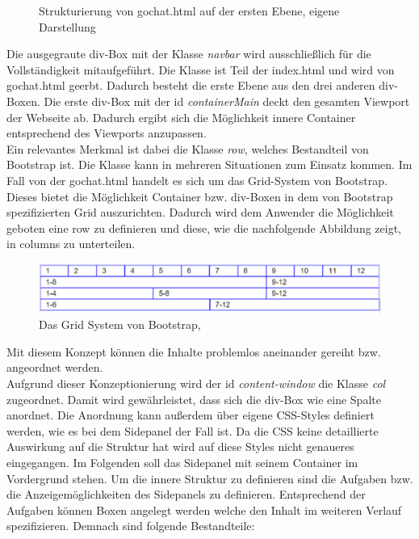 \documentclass[a4paper,titlepage,halfparskip,12pt]{scrreprt}
\begin{document}
\begin{onehalfspacing}
\begin{figure}[h]
	\caption{Strukturierung von gochat.html auf der ersten Ebene, eigene Darstellung}
	\label{img:BasisStruktur1Gochat}
\end{figure}
Die ausgegraute div-Box mit der Klasse \textit{navbar} wird ausschließlich für die Vollständigkeit mitaufgeführt. Die Klasse ist Teil der index.html und wird von gochat.html geerbt. Dadurch besteht die erste Ebene aus den drei anderen div-Boxen. Die erste div-Box mit der id \textit{containerMain} deckt den gesamten Viewport der Webseite ab. Dadurch ergibt sich die Möglichkeit innere Container entsprechend des Viewports anzupassen.\\
Ein relevantes Merkmal ist dabei die Klasse \textit{row}, welches Bestandteil von Bootstrap ist. Die Klasse kann in mehreren Situationen zum Einsatz kommen. Im Fall von der gochat.html handelt es sich um das Grid-System von Bootstrap. Dieses bietet die Möglichkeit Container bzw. div-Boxen in dem von Bootstrap spezifizierten Grid auszurichten. Dadurch wird dem Anwender die Möglichkeit geboten eine row zu definieren und diese, wie die nachfolgende Abbildung zeigt, in columns zu unterteilen.
\begin{figure}[h]
	\centering
	\includegraphics[scale=0.9]{images/GridSystem}
	\caption{Das Grid System von Bootstrap, \cite{krause2016introducing}}
	\label{img:GridSystem}
\end{figure}
Mit diesem Konzept können die Inhalte problemlos aneinander gereiht bzw. angeordnet werden. \cite{krause2016introducing}\\
Aufgrund dieser Konzeptionierung wird der id \textit{content-window} die Klasse \textit{col} zugeordnet. Damit wird gewährleistet, dass sich die div-Box wie eine Spalte anordnet. Die Anordnung kann außerdem über eigene CSS-Styles definiert werden, wie es bei dem Sidepanel der Fall ist. Da die CSS keine detaillierte Auswirkung auf die Struktur hat wird auf diese Styles nicht genaueres eingegangen. Im Folgenden soll das Sidepanel mit seinem Container im Vordergrund stehen. Um die innere Struktur zu definieren sind die Aufgaben bzw. die Anzeigemöglichkeiten des Sidepanels zu definieren. Entsprechend der Aufgaben können Boxen angelegt werden welche den Inhalt im weiteren Verlauf spezifizieren. Demnach sind folgende Bestandteile:
\begin{itemize}

\end{itemize}
\end{onehalfspacing}
\end{document}
